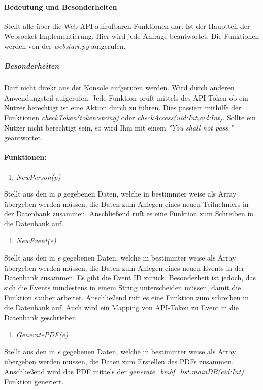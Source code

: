 \documentclass[12pt,parskip=full, pagea4]{scrreprt}
\begin{document}
			\paragraph{Bedeutung und Besonderheiten}Stellt alle über die Web-API aufrufbaren Funktionen dar. Ist der Hauptteil der Websocket Implementierung. Hier wird jede Anfrage beantwortet. Die Funktionen werden von der \textit{webstart.py} aufgerufen.
			\subparagraph{Besonderheiten}Darf nicht direkt aus der Konsole aufgerufen werden. Wird durch anderen Anwendungsteil aufgerufen. Jede Funktion prüft mittels des API-Token ob ein Nutzer berechtigt ist eine Aktion durch zu führen. Dies passiert mithilfe der Funktionen \textit{checkToken(token:string)} oder \textit{checkAccess(uid:Int,eid:Int)}. Sollte ein Nutzer nicht berechtigt sein, so wird Ihm mit einem \textit{"You shall not pass."} geantwortet.
			\paragraph{Funktionen:}
			\begin{enumerate}
				\item \textit{NewPerson(p)} 
			\end{enumerate}
			\leftskip=1.5cm Stellt aus den in \textit{p} gegebenen Daten, welche in bestimmter weise als Array übergeben werden müssen, die Daten zum Anlegen eines neuen Teilnehmers in der Datenbank zusammen. Anschließend ruft es eine Funktion zum Schreiben in die Datenbank auf.
			\begin{enumerate}[resume]
				\item \textit{NewEvent(e)}
			\end{enumerate}
			\leftskip=1.5cm	Stellt aus den in \textit{e} gegebenen Daten, welche in bestimmter weise als Array übergeben werden müssen, die Daten zum Anlegen eines neuen Events in der Datenbank zusammen. Es gibt die Event ID zurück. Besonderheit ist jedoch, das sich die Events mindestens in einem String unterscheiden müssen, damit die Funktion sauber arbeitet. Anschließend ruft es eine Funktion zum schreiben in die Datenbank auf. Auch wird ein Mapping von API-Token zu Event in die Datenbank geschrieben.
			\begin{enumerate}[resume]
				\item \textit{GeneratePDF(e)}
			\end{enumerate}
			\leftskip=1.5cm	Stellt aus den in \textit{e} gegebenen Daten, welche in bestimmter weise als Array übergeben werden müssen, die Daten zum Erstellen des PDFs zusammen. Anschließend wird das PDF mittels der \textit{generate\_bmbf\_list.mainDB(eid:Int)} Funktion generiert.
\end{document}
